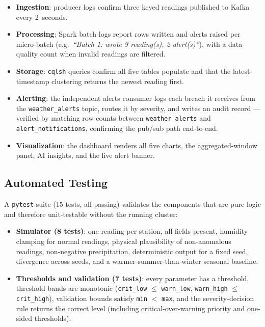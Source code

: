 \documentclass[conference,a4paper]{IEEEtran}
\begin{document}
\begin{itemize}
  \item \textbf{Ingestion}: producer logs confirm three keyed readings published
        to Kafka every 2~seconds.
  \item \textbf{Processing}: Spark batch logs report rows written and alerts
        raised per micro-batch (e.g.\ \emph{``Batch 1: wrote 9 reading(s),
        2 alert(s)''}), with a data-quality count when invalid readings are
        filtered.
  \item \textbf{Storage}: \texttt{cqlsh} queries confirm all five tables
        populate and that the latest-timestamp clustering returns the newest
        reading first.
  \item \textbf{Alerting}: the independent alerts consumer logs each breach it
        receives from the \texttt{weather\_alerts} topic, routes it by severity,
        and writes an audit record --- verified by matching row counts between
        \texttt{weather\_alerts} and \texttt{alert\_notifications}, confirming
        the pub/sub path end-to-end.
  \item \textbf{Visualization}: the dashboard renders all five charts, the
        aggregated-window panel, AI insights, and the live alert banner.
\end{itemize}

\subsection{Automated Testing}

A \texttt{pytest} suite (15 tests, all passing) validates the components that are
pure logic and therefore unit-testable without the running cluster:

\begin{itemize}
  \item \textbf{Simulator (8 tests)}: one reading per station, all fields
        present, humidity clamping for normal readings, physical plausibility of
        non-anomalous readings, non-negative precipitation, deterministic output
        for a fixed seed, divergence across seeds, and a warmer-summer-than-winter
        seasonal baseline.
  \item \textbf{Thresholds and validation (7 tests)}: every parameter has a
        threshold, threshold bands are monotonic (\texttt{crit\_low} $\le$
        \texttt{warn\_low}, \texttt{warn\_high} $\le$ \texttt{crit\_high}),
        validation bounds satisfy \texttt{min} $<$ \texttt{max}, and the
        severity-decision rule returns the correct level (including
        critical-over-warning priority and one-sided thresholds).
\end{itemize}
\end{document}
